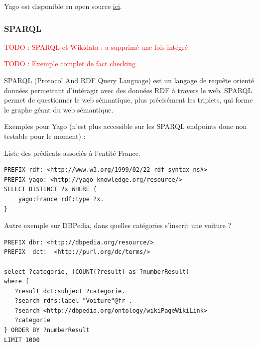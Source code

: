 \documentclass[12pt]{article}
\newcommand\todo[1]{\textcolor{red}{TODO : #1}}
\begin{document}
Yago est disponible en open source \href{https://github.com/yago-naga/yago3}{ici}.

\subsubsection{SPARQL}

\todo{SPARQL et Wikidata : a supprimé une fois intégré}

\todo{Exemple complet de fact checking}

SPARQL (Protocol And RDF Query Language) est un langage de requête orienté données permettant d'intéragir avec des données RDF à travers le web. SPARQL permet de questionner le web sémantique, plus précisément les triplets, qui forme le graphe géant du web sémantique.

Exemples pour Yago (n'est plus accessible sur les SPARQL endpoints donc non testable pour le moment) :

Liste des prédicats associés à l'entité France.

\begin{lstlisting}[language=SPARQL, backgroundcolor=\color{lightgray}]
PREFIX rdf: <http://www.w3.org/1999/02/22-rdf-syntax-ns#> 
PREFIX yago: <http://yago-knowledge.org/resource/>
SELECT DISTINCT ?x WHERE {
    yago:France rdf:type ?x.
}
\end{lstlisting}

Autre exemple sur DBPedia, dans quelles catégories s'inscrit une voiture ?

\begin{lstlisting}[language=SPARQL, backgroundcolor=\color{lightgray}]
PREFIX dbr: <http://dbpedia.org/resource/>
PREFIX  dct:  <http://purl.org/dc/terms/> 

select ?categorie, (COUNT(?result) as ?numberResult) 
where {
   ?result dct:subject ?categorie.
   ?search rdfs:label "Voiture"@fr .
   ?search <http://dbpedia.org/ontology/wikiPageWikiLink> 
   ?categorie
} ORDER BY ?numberResult
LIMIT 1000
\end{lstlisting}
\end{document}
